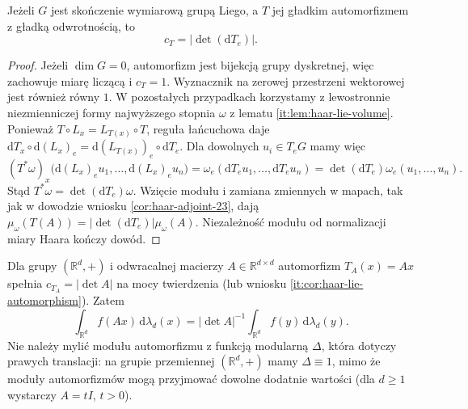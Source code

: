 \begin{wniosek}
\label{it:cor:haar-lie-automorphism}
Jeżeli $G$ jest skończenie wymiarową grupą Liego,
a $T$ jej gładkim automorfizmem z gładką odwrotnością,
to
\[
 c_T=|\det(\mathrm dT_e)|.
\]
\end{wniosek}
\begin{proof}
Jeżeli $\dim G=0$, automorfizm jest bijekcją grupy
dyskretnej, więc zachowuje miarę liczącą i $c_T=1$.
Wyznacznik na zerowej przestrzeni wektorowej jest
również równy $1$. W pozostałych przypadkach
korzystamy z lewostronnie niezmienniczej formy
najwyższego stopnia $\omega$ z lematu
\ref{it:lem:haar-lie-volume}.
Ponieważ $T\circ L_x=L_{T(x)}\circ T$,
reguła łańcuchowa daje
$\mathrm dT_x\circ\mathrm d(L_x)_e
=\mathrm d(L_{T(x)})_e\circ\mathrm dT_e$.
Dla dowolnych $u_i\in T_eG$ mamy więc
\[
 (T^*\omega)_x\bigl(\mathrm d(L_x)_e u_1,\ldots,
                       \mathrm d(L_x)_e u_n\bigr)
 =\omega_e(\mathrm dT_e u_1,\ldots,\mathrm dT_e u_n)
 =\det(\mathrm dT_e)\omega_e(u_1,\ldots,u_n).
\]
Stąd $T^*\omega=\det(\mathrm dT_e)\omega$.
Wzięcie modułu i zamiana zmiennych w mapach,
tak jak w dowodzie wniosku \ref{cor:haar-adjoint-23},
dają $\mu_\omega(T(A))=|\det(\mathrm dT_e)|\mu_\omega(A)$.
Niezależność modułu od normalizacji miary Haara
kończy dowód.
\end{proof}

\begin{przyklad}
Dla grupy $(\mathbb R^d,+)$ i odwracalnej macierzy
$A\in\mathbb R^{d\times d}$ automorfizm $T_A(x)=Ax$
spełnia $c_{T_A}=|\det A|$ na mocy twierdzenia
 (lub wniosku
\ref{it:cor:haar-lie-automorphism}). Zatem
\[
 \int_{\mathbb R^d} f(Ax)\,\mathrm d\lambda_d(x)
 =|\det A|^{-1}\int_{\mathbb R^d} f(y)\,\mathrm d\lambda_d(y).
\]
Nie należy mylić modułu automorfizmu z funkcją
modularną $\Delta$, która dotyczy prawych translacji:
na grupie przemiennej $(\mathbb R^d,+)$ mamy
$\Delta\equiv1$, mimo że moduły automorfizmów
mogą przyjmować dowolne dodatnie wartości
(dla $d\ge1$ wystarczy $A=tI$, $t>0$).
\end{przyklad}
